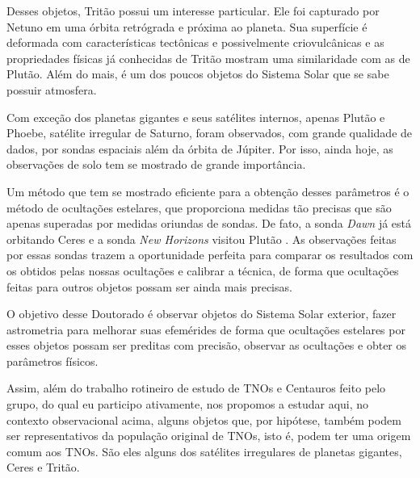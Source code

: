 \documentclass[12pt,a4paper]{report}
\makeatletter
\renewcommand\chapter{\thispagestyle{plain}
                \global\@topnum\z@
                \@afterindentfalse
                \secdef\@chapter\@schapter}
\makeatother
\begin{document}
Desses objetos, Tritão possui um interesse particular. Ele foi capturado por Netuno \citep{McKinnon2007} em uma órbita retrógrada e próxima ao planeta. Sua superfície é deformada com características tectônicas e possivelmente criovulcânicas \citep{Nimmo2015} e as propriedades físicas já conhecidas de Tritão mostram uma similaridade com as de Plutão. Além do mais, é um dos poucos objetos do Sistema Solar que se sabe possuir atmosfera.

Com exceção dos planetas gigantes e seus satélites internos, apenas Plutão e Phoebe, satélite irregular de Saturno, foram observados, com grande qualidade de dados, por sondas espaciais além da órbita de Júpiter. Por isso, ainda hoje, as observações de solo tem se mostrado de grande importância.

Um método que tem se mostrado eficiente para a obtenção desses parâmetros é o método de ocultações estelares, que proporciona medidas tão precisas que são apenas superadas por medidas oriundas de sondas. De fato, a sonda \textit{Dawn} já está orbitando Ceres e a sonda \textit{New Horizons} visitou Plutão \citep{Stern2015}. As observações feitas por essas sondas trazem a oportunidade perfeita para comparar os resultados com os obtidos pelas nossas ocultações e calibrar a técnica, de forma que ocultações feitas para outros objetos possam ser ainda mais precisas.

O objetivo desse Doutorado é observar objetos do Sistema Solar exterior, fazer astrometria para melhorar suas efemérides de forma que ocultações estelares por esses objetos possam ser preditas com precisão, observar as ocultações e obter os parâmetros físicos.

Assim, além do trabalho rotineiro de estudo de TNOs e Centauros feito pelo grupo, do qual eu participo ativamente, nos propomos a estudar aqui, no contexto observacional acima, alguns objetos que, por hipótese, também podem ser representativos da população original de TNOs, isto é, podem ter uma origem comum aos TNOs. São eles alguns dos satélites irregulares de planetas gigantes, Ceres e Tritão.



\end{document}
